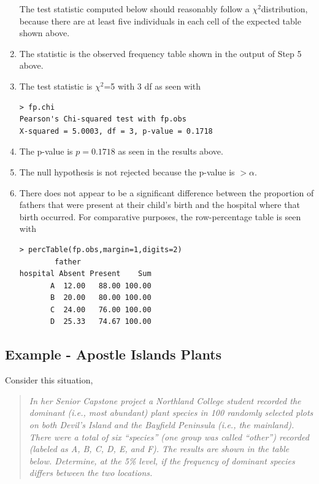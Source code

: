 \documentclass[10pt,openany]{book}\usepackage[]{graphicx}\usepackage[]{color}
\makeatletter
\newenvironment{kframe}{%
 \def\at@end@of@kframe{}%
 \ifinner\ifhmode%
  \def\at@end@of@kframe{\end{minipage}}%
  \begin{minipage}{\columnwidth}%
 \fi\fi%
 \def\FrameCommand##1{\hskip\@totalleftmargin \hskip-\fboxsep
 \colorbox{shadecolor}{##1}\hskip-\fboxsep
     \hskip-\linewidth \hskip-\@totalleftmargin \hskip\columnwidth}%
 \MakeFramed {\advance\hsize-\width
   \@totalleftmargin\z@ \linewidth\hsize
   \@setminipage}}%
 {\par\unskip\endMakeFramed%
 \at@end@of@kframe}
\newenvironment{knitrout}{}{} %
\makeatother
\begin{document}
\begin{enumerate}
\begin{knitrout}
\end{knitrout}
The test statistic computed below should reasonably follow a $\chi^{2}$distribution, because there are at least five individuals in each cell of the expected table shown above.
    \item The statistic is the observed frequency table shown in the output of Step 5 above.
    \item The test statistic is $\chi^{2}$=5 with 3 df as seen with
\begin{knitrout}
\color{fgcolor}\begin{kframe}
\begin{verbatim}
> fp.chi
Pearson's Chi-squared test with fp.obs 
X-squared = 5.0003, df = 3, p-value = 0.1718
\end{verbatim}
\end{kframe}
\end{knitrout}
    \item The p-value is $p=0.1718$ as seen in the results above.
    \item The null hypothesis is not rejected because the p-value is $>\alpha$.
    \item There does not appear to be a significant difference between the proportion of fathers that were present at their child's birth and the hospital where that birth occurred.  For comparative purposes, the row-percentage table is seen with
\begin{knitrout}
\color{fgcolor}\begin{kframe}
\begin{verbatim}
> percTable(fp.obs,margin=1,digits=2)
        father
hospital Absent Present    Sum
       A  12.00   88.00 100.00
       B  20.00   80.00 100.00
       C  24.00   76.00 100.00
       D  25.33   74.67 100.00
\end{verbatim}
\end{kframe}
\end{knitrout}
  \end{enumerate}

\subsection{Example - Apostle Islands Plants}
Consider this situation,
\begin{quote}
\textsl{In her Senior Capstone project a Northland College student recorded the dominant (i.e., most abundant) plant species in 100 randomly selected plots on both Devil's Island and the Bayfield Peninsula (i.e., the mainland).  There were a total of six ``species'' (one group was called ``other'') recorded (labeled as A, B, C, D, E, and F).  The results are shown in the table below.  Determine, at the 5\% level, if the frequency of dominant species differs between the two locations.}
\end{quote}
\end{document}
